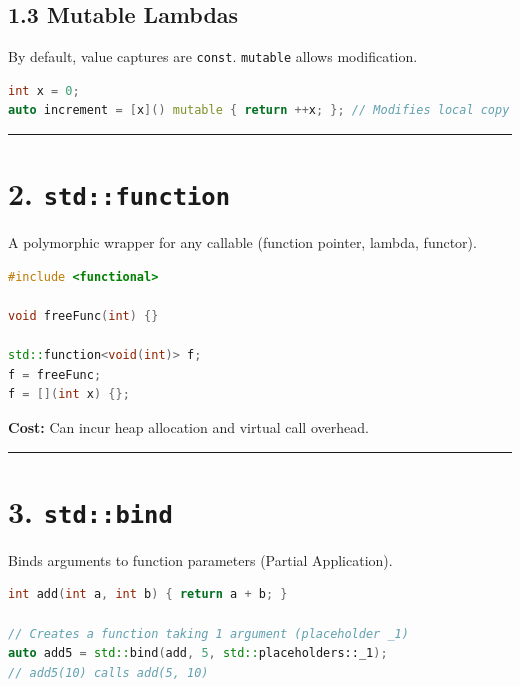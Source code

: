\hypertarget{mutable-lambdas}{%
\subsection{1.3 Mutable Lambdas}\label{mutable-lambdas}}

By default, value captures are \passthrough{\lstinline!const!}.
\passthrough{\lstinline!mutable!} allows modification.

\begin{lstlisting}[language={C++}]
int x = 0;
auto increment = [x]() mutable { return ++x; }; // Modifies local copy
\end{lstlisting}

\begin{center}\rule{0.5\linewidth}{0.5pt}\end{center}

\hypertarget{stdfunction}{%
\section{\texorpdfstring{2.
\texttt{std::function}}{2. std::function}}\label{stdfunction}}

A polymorphic wrapper for any callable (function pointer, lambda,
functor).

\begin{lstlisting}[language={C++}]
#include <functional>

void freeFunc(int) {}

std::function<void(int)> f;
f = freeFunc;
f = [](int x) {}; 
\end{lstlisting}

\textbf{Cost:} Can incur heap allocation and virtual call overhead.

\begin{center}\rule{0.5\linewidth}{0.5pt}\end{center}

\hypertarget{stdbind}{%
\section{\texorpdfstring{3.
\texttt{std::bind}}{3. std::bind}}\label{stdbind}}

Binds arguments to function parameters (Partial Application).

\begin{lstlisting}[language={C++}]
int add(int a, int b) { return a + b; }

// Creates a function taking 1 argument (placeholder _1)
auto add5 = std::bind(add, 5, std::placeholders::_1); 
// add5(10) calls add(5, 10)
\end{lstlisting}


